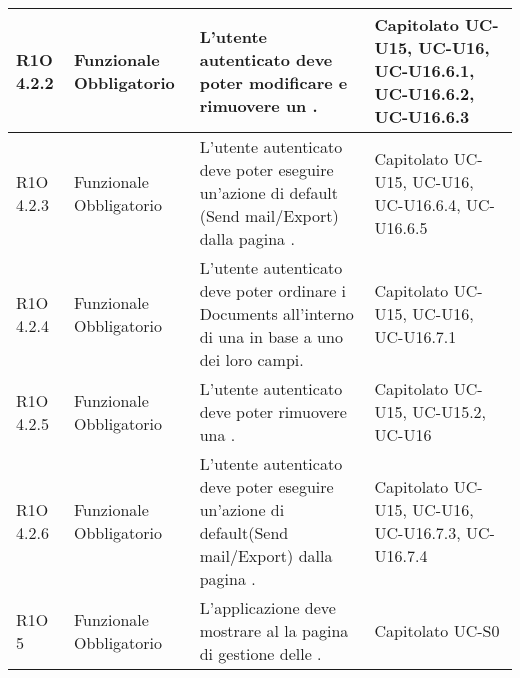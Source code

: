 \begin{center}
\begin{longtable}{ | l | p{2cm} | p{4.7cm} | p{2cm} |}
	R1O 4.2.2 & Funzionale \newline Obbligatorio & L’utente autenticato deve poter modificare e rimuovere un \glossaryItem{Document}. &  Capitolato \newline UC-U15, UC-U16, UC-U16.6.1, UC-U16.6.2, UC-U16.6.3  \newline  \\ \hline
	
	R1O 4.2.3 & Funzionale \newline Obbligatorio & L’utente autenticato deve poter eseguire un’azione di default (Send mail/Export) dalla pagina \glossaryItem{Document}.&  Capitolato \newline UC-U15, UC-U16, UC-U16.6.4, UC-U16.6.5  \newline  \\ \hline
	
	R1O 4.2.4 & Funzionale \newline Obbligatorio & L’utente autenticato deve poter ordinare i Documents all’interno di una \glossaryItem{Collection} in base a uno dei loro campi. &  Capitolato \newline UC-U15, UC-U16, UC-U16.7.1  \newline  \\ \hline
	
	R1O 4.2.5 & Funzionale \newline Obbligatorio & L’utente autenticato deve poter rimuovere una \glossaryItem{Collection}. &  Capitolato \newline UC-U15, UC-U15.2, UC-U16  \newline  \\ \hline
	
	R1O 4.2.6 & Funzionale \newline Obbligatorio & L’utente autenticato deve poter eseguire un’azione di default(Send mail/Export) dalla pagina \glossaryItem{Collection}. &  Capitolato \newline UC-U15, UC-U16, UC-U16.7.3, UC-U16.7.4  \newline  \\ \hline
	
	R1O 5 & Funzionale \newline Obbligatorio & L'applicazione deve mostrare al \glossaryItem{Super-Admin} la pagina di gestione delle \glossaryItem{Company}. &  Capitolato \newline UC-S0  \newline  \\ \hline
	

\end{longtable}
\end{center}
